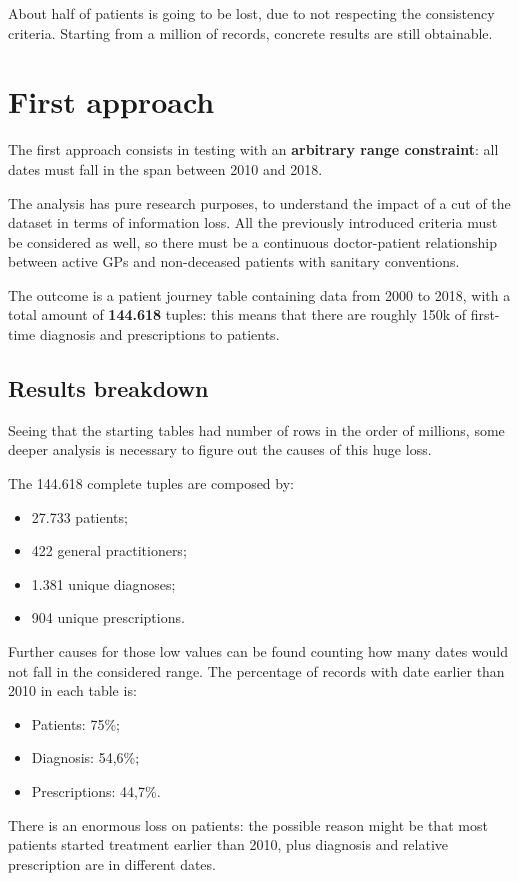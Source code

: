 About half of patients is going to be lost, due to not respecting the consistency criteria. Starting from a million of records, concrete results are still obtainable.

\section{First approach}
The first approach consists in testing with an \textbf{arbitrary range constraint}: all dates must fall in the span between 2010 and 2018.

The analysis has pure research purposes, to understand the impact of a cut of the dataset in terms of information loss. All the previously introduced criteria must be considered as well, so there must be a continuous doctor-patient relationship between active GPs and non-deceased patients with sanitary conventions.

The outcome is a patient journey table containing data from 2000 to 2018, with a total amount of \textbf{144.618} tuples: this means that there are roughly 150k of first-time diagnosis and prescriptions to patients. 

\subsection{Results breakdown}
Seeing that the starting tables had number of rows in the order of millions, some deeper analysis is necessary to figure out the causes of this huge loss.

The 144.618 complete tuples are composed by:
\begin{itemize}
	\item 27.733 patients;
	\item 422 general practitioners;
	\item 1.381 unique diagnoses;
	\item 904 unique prescriptions.
\end{itemize}

Further causes for those low values can be found counting how many dates would not fall in the considered range. The percentage of records with date earlier than 2010 in each table is:
\begin{itemize}
	\item Patients: 75\%;
	\item Diagnosis: 54,6\%;
	\item Prescriptions: 44,7\%.
\end{itemize}

There is an enormous loss on patients: the possible reason might be that most patients started treatment earlier than 2010, plus diagnosis and relative prescription are in different dates.

